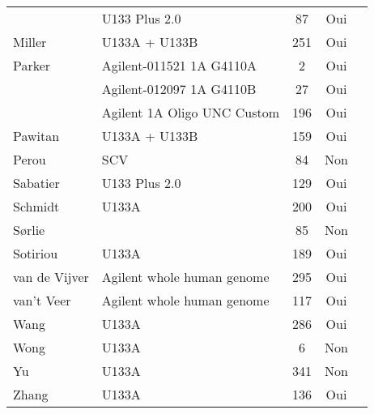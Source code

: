 \begin{table}
\begin{center}
\begin{tabular}{llccc}
                                  & U133 Plus 2.0                   & 87                     & Oui                   \\
            Miller                & U133A + U133B                   & 251                    & Oui                   \\
            Parker                & Agilent-011521 1A G4110A        & 2                      & Oui                   \\
                                  & Agilent-012097 1A G4110B        & 27                     & Oui                   \\
                                  & Agilent 1A Oligo UNC Custom     & 196                    & Oui                   \\
            Pawitan               & U133A + U133B                   & 159                    & Oui                   \\
            Perou                 & SCV                             & 84                     & Non                   \\
            Sabatier              & U133 Plus 2.0                   & 129                    & Oui                   \\
            Schmidt               & U133A                           & 200                    & Oui                   \\
            S{\o}rlie             &                                 & 85                     & Non                   \\
            Sotiriou              & U133A                           & 189                    & Oui                   \\
            van de Vijver         & Agilent whole human genome      & 295                    & Oui                   \\
            van't Veer            & Agilent whole human genome      & 117                    & Oui                   \\
            Wang                  & U133A                           & 286                    & Oui                   \\
            Wong                  & U133A                           & 6                      & Non                   \\
            Yu                    & U133A                           & 341                    & Non                   \\
            Zhang                 & U133A                           & 136                    & Oui                   \\

\end{tabular}
\end{center}
\end{table}
